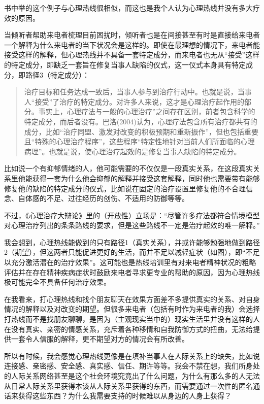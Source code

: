 书中举的这个例子与心理热线很相似，而这也是我个人认为心理热线并没有多大疗效的原因。

当倾听者帮助来电者梳理目前困扰时，倾听者也是在间接甚至有时是直接给来电者一个解释\pozhehao{}为什么来电者的当下状况会是这样的。即使在最理想的情况下，来电者能接受这样的解释，但心理热线并不具备一套特定成分，而来电者也无从“接受”这样的特定成分，即缺乏一套旨在修复当事人缺陷的仪式，这一仪式本身具有特定成分，即路径3（特定成分）：

\blockquote{
	治疗目标和任务达成一致后，当事人参与到治疗行动中。也就是说，当事人“接受”了治疗的特定成分。对许多人来说，这才是心理治疗起作用的部分。事实上，心理疗法与一般的心理治疗”之间存在区别，前者包含科学的特定成分，而后者没有。巴洛(2004)认为，心理疗法包含所有治疗都共有的成分，比如“治疗同盟、激发对改变的积极预期和重新振作”，但也包括重要且“特殊的心理治疗程序”，这些程序“特定性地针对当前人们所面临的心理病理”。也就是说，使心理治疗起效的是修复当事人缺陷的特定成分。

}

比如说一个有抑郁情绪的人，他可能需要的不仅仅是一段真实关系，在这段真实关系里他能获得一套为什么他会抑郁的解释并接受这套解释，同时他也需要带有能够修复他的缺陷的特定成分的仪式，比如说在固定的治疗设置里修复他的不合理信念、自体感的不足、过往经历的创伤、不适用的防御等等。

不过，《心理治疗大辩论》里的（开放性）立场是：“尽管许多疗法都符合情境模型对心理治疗列出的条条路线的要求，但是这些路线不一定是治疗起效的唯一解释。”

我会想到，心理热线能做到的只有路径1（真实关系），并或许能够勉强地做到路径2（期望），但这两者只能促进更好的生活，而并不足以减轻症状（如图），即“不足以充分激活潜在的治疗效果”。这可能也是热线培训里有对来电者精神状况的粗略评估并在存在精神疾病症状时鼓励来电者寻求更专业的帮助的原因，因为心理热线极可能完全不具备任何治疗效果。

在我看来，打心理热线和找个朋友聊天在效果方面差不多\pozhehao{}提供真实的关系、对自身情况的解释以及对改变的期望。但很多来电者（包括有时作为来电者的我）会选择打热线而不是找朋友聊聊，是因为（主观现实当中的）现实生活里并没有这样的人在\pozhehao{}没有真实、亲密的情感关系，充斥着各种移情和自我防御方式的扭曲，无法给提供一套令人信服的解释，更不期望对方的情况会有所改善。

所以有时候，我会感觉心理热线更像是在填补当事人在人际关系上的缺失，比如说连接感、亲密感、安全感、真实感、信任、期许等等。我会不禁在想，我们所身处的人际关系网络甚至是这个社会环境究竟出了什么问题，为什么有那么多的人无法从日常人际关系里获得本该从人际关系里获得的东西，而需要通过一次性的匿名通话来获得这些东西？为什么我需要支持的时候难以从身边的人身上获得？

